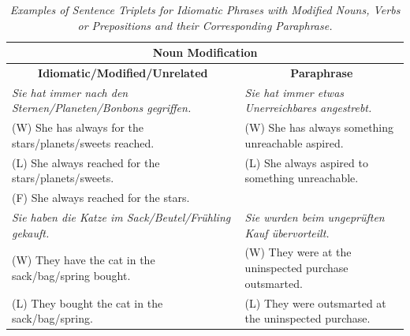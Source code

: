 \begin{table}[]
\caption{\textit{Examples of Sentence Triplets for Idiomatic Phrases with Modified Nouns, Verbs or Prepositions and their Corresponding Paraphrase.}}
\label{tab:triplets}
\resizebox{\textwidth}{!}
{\begin{tabular}{|p{4in}|p{4in}|}

\hline
\multicolumn{2}{|c|}{\textbf{Noun Modification}}                                                                                                                      \\ \hline
\multicolumn{1}{|c|}{\textbf{Idiomatic/Modified/Unrelated}}            & \multicolumn{1}{c|}{\textbf{Paraphrase}}                                                     \\ \hline
\textit{Sie hat immer nach den Sternen/Planeten/Bonbons gegriffen.}    & \textit{Sie hat immer etwas Unerreichbares angestrebt.}                                      \\
\hspace{3mm}(W) She has always for the stars/planets/sweets reached.               & \hspace{3mm}(W) She has always something unreachable aspired.                                            \\
\hspace{3mm}(L) She always reached for the stars/planets/sweets.                   & \hspace{3mm}(L) She always aspired to something unreachable.                                             \\
\hspace{3mm}(F) She always reached for the stars.                                  &                                                                                              \\ \hline
\textit{Sie haben die Katze im Sack/Beutel/Frühling gekauft.}          & \textit{Sie wurden beim ungeprüften Kauf übervorteilt.}                                      \\
\hspace{3mm}(W) They have the cat in the sack/bag/spring bought.                   & \hspace{3mm}(W) They were at the uninspected purchase outsmarted.                                        \\
\hspace{3mm}(L) They bought the cat in the sack/bag/spring.                        & \hspace{3mm}(L) They were outsmarted at the uninspected purchase.                                        \\

\end{tabular}}
\end{table}
